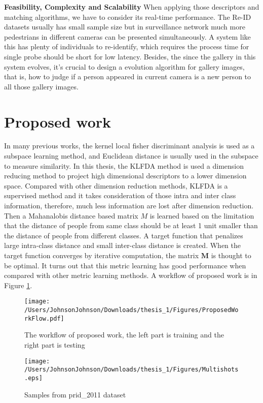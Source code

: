 \textbf{Feasibility, Complexity and Scalability} When applying those descriptors and matching algorithms, we have to consider its real-time performance. The Re-ID datasets usually has small sample size but in surveillance network much more pedestrians in different cameras can be presented simultaneously. A system like this has plenty of individuals to re-identify, which requires the process time for single probe should be short for low latency. Besides, the since the gallery in this system evolves, it's crucial to design a evolution algorithm for gallery images, that is, how to judge if a person appeared in current camera is a new person to all those gallery images.

\section{Proposed work}
In many previous works, the kernel local fisher discriminant analysis is used as a subspace learning method, and Euclidean distance is usually used in the subspace to measure similarity. In this thesis, the KLFDA \cite{KLFDA} method is used a dimension reducing method to project high dimensional descriptors to a lower dimension space. Compared with other dimension reduction methods, KLFDA is a supervised method and it takes consideration of those intra and inter class information, therefore, much less information are lost after dimension reduction. Then a Mahanalobis distance based matrix $M$ is learned based on the limitation that the distance of people from same class should be at least 1 unit smaller than the distance of people from different classes. A target function that penalizes large intra-class distance and small inter-class distance is created. When the target function converges by iterative computation, the matrix $\bm{M}$ is thought to be optimal. It turns out that this metric learning has good performance when compared with other metric learning methods. A workflow of proposed work is in Figure \ref{ProposedWorkflow}.

\begin{figure}[H]

\texttt{[image: /Users/JohnsonJohnson/Downloads/thesis\_1/Figures/ProposedWorkFlow.pdf]}
\vspace{-2em}
\caption{The workflow of proposed work, the left part is training and the right part is testing}
\label{ProposedWorkflow}

\end{figure}
\begin{figure}[H]

\texttt{[image: /Users/JohnsonJohnson/Downloads/thesis\_1/Figures/Multishots.eps]}
\vspace{-2em}
\caption{Samples from prid\_2011 dataset}

\end{figure}


